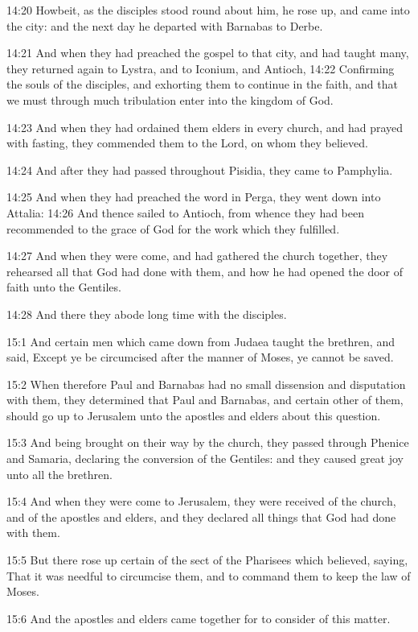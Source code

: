14:20 Howbeit, as the disciples stood round about him, he rose up, and
came into the city: and the next day he departed with Barnabas to
Derbe.

14:21 And when they had preached the gospel to that city, and had
taught many, they returned again to Lystra, and to Iconium, and
Antioch, 14:22 Confirming the souls of the disciples, and exhorting
them to continue in the faith, and that we must through much
tribulation enter into the kingdom of God.

14:23 And when they had ordained them elders in every church, and had
prayed with fasting, they commended them to the Lord, on whom they
believed.

14:24 And after they had passed throughout Pisidia, they came to
Pamphylia.

14:25 And when they had preached the word in Perga, they went down
into Attalia: 14:26 And thence sailed to Antioch, from whence they had
been recommended to the grace of God for the work which they
fulfilled.

14:27 And when they were come, and had gathered the church together,
they rehearsed all that God had done with them, and how he had opened
the door of faith unto the Gentiles.

14:28 And there they abode long time with the disciples.

15:1 And certain men which came down from Judaea taught the brethren,
and said, Except ye be circumcised after the manner of Moses, ye
cannot be saved.

15:2 When therefore Paul and Barnabas had no small dissension and
disputation with them, they determined that Paul and Barnabas, and
certain other of them, should go up to Jerusalem unto the apostles and
elders about this question.

15:3 And being brought on their way by the church, they passed through
Phenice and Samaria, declaring the conversion of the Gentiles: and
they caused great joy unto all the brethren.

15:4 And when they were come to Jerusalem, they were received of the
church, and of the apostles and elders, and they declared all things
that God had done with them.

15:5 But there rose up certain of the sect of the Pharisees which
believed, saying, That it was needful to circumcise them, and to
command them to keep the law of Moses.

15:6 And the apostles and elders came together for to consider of this
matter.

